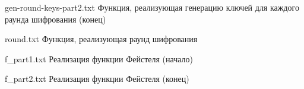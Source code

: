 {gen-round-keys-part2.txt} %
{Функция, реализующая генерацию ключей для каждого раунда шифрования (конец)} %

{round.txt} %
{Функция, реализующая раунд шифрования} %

{f_part1.txt} %
{Реализация функции Фейстеля (начало)} %

{f_part2.txt} %
{Реализация функции Фейстеля (конец)} %

